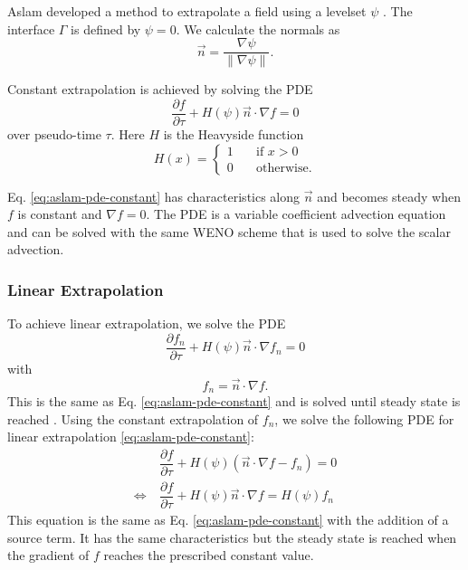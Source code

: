 \documentclass{article}
\numberwithin{equation}{section}
\newcommand{\pd}[2]{\dfrac{\partial #1}{\partial #2}}
\begin{document}
Aslam developed a method to extrapolate a field using a levelset $\psi$ \cite{aslamPartialDifferentialEquation2004}.
The interface $\Gamma$ is defined by $\psi = 0$.
We calculate the normals as
\begin{equation}
    \vec{n} = \frac{\nabla \psi}{\|\nabla \psi\|}.
\end{equation}

Constant extrapolation is achieved by solving the PDE
\begin{equation}
    \pd{f}{\tau} + H(\psi) \vec{n} \cdot \nabla f = 0
    \label{eq:aslam-pde-constant}
\end{equation}
over pseudo-time $\tau$.
Here $H$ is the Heavyside function
\begin{equation}
    H(x) = \begin{cases}
        1 \quad &\text{if } x > 0 \\
        0 &\text{otherwise}.
    \end{cases}
\end{equation}

Eq. \eqref{eq:aslam-pde-constant} has characteristics along $\vec{n}$ and becomes steady when $f$ is constant and $\nabla f = 0$.
The PDE is a variable coefficient advection equation and can be solved with the same WENO scheme that is used to solve the scalar advection.

\subsubsection{Linear Extrapolation}

To achieve linear extrapolation, we solve the PDE
\begin{equation}
    \pd{f_n}{\tau} + H(\psi) \vec{n} \cdot \nabla f_n = 0
\end{equation}
with
\begin{equation}
    f_n = \vec{n} \cdot \nabla f.
\end{equation}
This is the same as Eq. \eqref{eq:aslam-pde-constant} and is solved until steady state is reached \cite{aslamPartialDifferentialEquation2004}.
Using the constant extrapolation of $f_n$, we solve the following PDE for linear extrapolation \eqref{eq:aslam-pde-constant}:
\begin{equation}
    \begin{split}
        &\pd{f}{\tau} + H(\psi) \left(\vec{n} \cdot \nabla f - f_n\right) = 0 \\
        \Leftrightarrow\ &\pd{f}{\tau} + H(\psi) \vec{n} \cdot \nabla f = H(\psi) f_n
    \end{split}
    \label{eq:aslam-pde-linear}
\end{equation}
This equation is the same as Eq. \eqref{eq:aslam-pde-constant} with the addition of a source term.
It has the same characteristics but the steady state is reached when the gradient of $f$ reaches the prescribed constant value.
\end{document}
